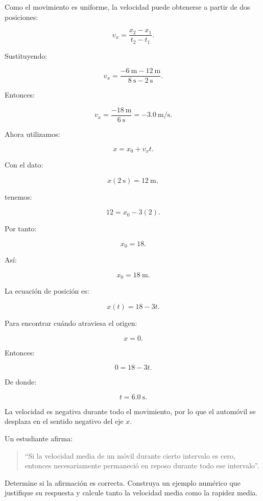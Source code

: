 \begin{explicacion}
Como el movimiento es uniforme, la velocidad puede obtenerse a partir de dos posiciones:

\[
v_x
=
\frac{x_2-x_1}{t_2-t_1}.
\]

Sustituyendo:

\[
v_x
=
\frac{
-\SI{6}{\meter}
-
\SI{12}{\meter}
}{
\SI{8}{\second}
-
\SI{2}{\second}
}.
\]

Entonces:

\[
v_x
=
\frac{-\SI{18}{\meter}}
{\SI{6}{\second}}
=
\boxed{-\SI{3.0}{\meter\per\second}}.
\]

Ahora utilizamos:

\[ x=x_0+v_xt. \]

Con el dato:

\[
x(\SI{2}{\second})=\SI{12}{\meter},
\]

tenemos:

\[
12=x_0-3(2).
\]

Por tanto:

\[
x_0=18.
\]

Así:

\[ \boxed{x_0=\SI{18}{\meter}}. \]

La ecuación de posición es:

\[ \boxed{x(t)=18-3t}. \]

Para encontrar cuándo atraviesa el origen:

\[ x=0. \]

Entonces:

\[
0=18-3t.
\]

De donde:

\[ \boxed{t=\SI{6.0}{\second}}. \]

La velocidad es negativa durante todo el movimiento, por lo que el automóvil se desplaza en el sentido negativo del eje \(x\).
\end{explicacion}


\begin{ejercicio}
Un estudiante afirma:

\begin{quote}
``Si la velocidad media de un móvil durante cierto intervalo es cero, entonces necesariamente permaneció en reposo durante todo ese intervalo''.
\end{quote}

Determine si la afirmación es correcta. Construya un ejemplo numérico que justifique su respuesta y calcule tanto la velocidad media como la rapidez media.
\end{ejercicio}

